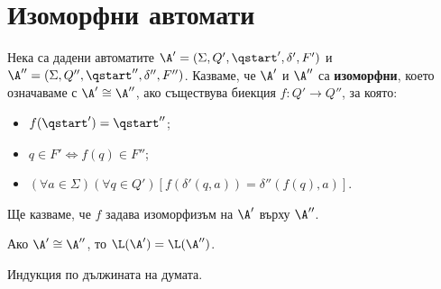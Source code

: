 \section{Изоморфни автомати}
\label{sect:isomorphic}

Нека са дадени автоматите
$\A' = (\Sigma,Q',\qstart',\delta',F')$ и $\A'' = (\Sigma, Q'', \qstart'', \delta'', F'')$.
Казваме, че $\A'$ и $\A''$ са {\bf изоморфни}, което означаваме с $\A' \cong \A''$, ако
съществува биекция $f: Q'\to Q''$, за която:
\begin{itemize}
\item
  $f(\qstart') = \qstart''$;
\item
  $q \in F' \iff f(q) \in F''$;
\item
  $(\forall a\in\Sigma)(\forall q\in Q')[f(\delta'(q,a)) = \delta''(f(q),a)]$.
\end{itemize}
Ще казваме, че $f$ задава изоморфизъм на $\A'$ върху $\A''$.

\begin{framed}
  \begin{thm}
    Ако $\A' \cong \A''$, то $\L(\A') = \L(\A'')$.
  \end{thm}  
\end{framed}
\begin{hint}
  Индукция по дължината на думата.
\end{hint}



